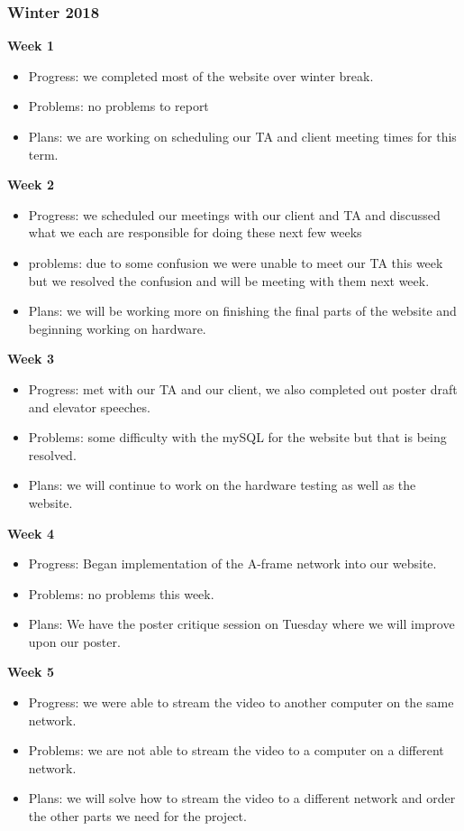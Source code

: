 \subsubsection{Winter 2018}
\textbf{Week 1}
\begin{itemize}
    \item Progress: we completed most of the website over winter break.
    \item Problems: no problems to report
    \item Plans: we are working on scheduling our TA and client meeting times for this term.
\end{itemize}
\textbf{Week 2}
\begin{itemize}
    \item Progress: we scheduled our meetings with our client and TA and discussed what we each are responsible for doing these next few weeks
    \item problems: due to some confusion we were unable to meet our TA this week but we resolved the confusion and will be meeting with them next week.
    \item Plans: we will be working more on finishing the final parts of the website and beginning working on hardware.
\end{itemize}
\textbf{Week 3}
\begin{itemize}
    \item Progress: met with our TA and our client, we also completed out poster draft and elevator speeches.
    \item Problems: some difficulty with the mySQL for the website but that is being resolved.
    \item Plans: we will continue to work on the hardware testing as well as the website.
\end{itemize}
\textbf{Week 4}
\begin{itemize}
    \item Progress: Began implementation of the A-frame network into our website.
    \item Problems: no problems this week.
    \item Plans: We have the poster critique session on Tuesday where we will improve upon our poster.
\end{itemize}
\textbf{Week 5}
\begin{itemize}
    \item Progress: we were able to stream the video to another computer on the same network.
    \item Problems: we are not able to stream the video to a computer on a different network.
    \item Plans: we will solve how to stream the video to a different network and order the other parts we need for the project.
\end{itemize}
